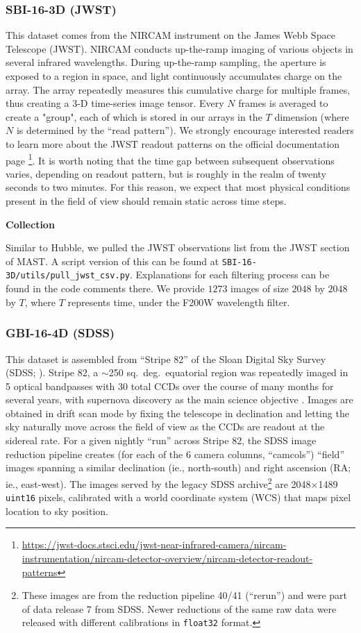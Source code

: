 \subsubsection{SBI-16-3D (JWST)}
This dataset comes from the NIRCAM instrument on the James Webb Space Telescope (JWST).  NIRCAM conducts up-the-ramp imaging of various objects in several infrared wavelengths. During up-the-ramp sampling, the aperture is exposed to a region in space, and light continuously accumulates charge on the array. The array repeatedly measures this cumulative charge for multiple frames, thus creating a 3-D time-series image tensor. Every $N$ frames is averaged to create a "group", each of which is stored in our arrays in the $T$ dimension (where $N$ is determined by the ``read pattern''). We strongly encourage interested readers to learn more about the JWST readout patterns on the official documentation page \footnote{\url{https://jwst-docs.stsci.edu/jwst-near-infrared-camera/nircam-instrumentation/nircam-detector-overview/nircam-detector-readout-patterns}}. It is worth noting that the time gap between subsequent observations varies, depending on readout pattern, but is roughly in the realm of twenty seconds to two minutes. For this reason, we expect that most physical conditions present in the field of view should remain static across time steps.


\textbf{Collection}

Similar to Hubble, we pulled the JWST observations list from the JWST section of MAST. A script version of this can be found at \texttt{SBI-16-3D/utils/pull\_jwst\_csv.py}. Explanations for each filtering process can be found in the code comments there. We provide $1273$ images of size $2048$ by $2048$ by $T$, where $T$ represents time, under the F200W wavelength filter.

\subsubsection{GBI-16-4D (SDSS)} 
This dataset is assembled from ``Stripe 82'' of the Sloan Digital Sky Survey (SDSS; \citet{2000AJ....120.1579Y}). Stripe 82, a $\sim$250 sq.\ deg.\ equatorial region was repeatedly imaged in 5 optical bandpasses with 30 total CCDs over the course of many months for several years, with supernova discovery as the main science objective \citep{2018PASP..130f4002S}.  Images are obtained in drift scan mode by fixing the telescope in declination and letting the sky naturally move across the field of view as the CCDs are readout at the sidereal rate. For a given nightly ``run'' across Stripe 82, the SDSS image reduction pipeline \citep{2002AJ....123..485S} creates (for each of the 6 camera columns, ``camcols'') ``field'' images spanning a similar declination (ie., north-south) and right ascension (RA; ie., east-west). The images served by the legacy SDSS archive\footnote{These images are from the reduction pipeline 40/41 (``rerun'') and were part of data release 7 from SDSS. Newer reductions of the same raw data were released with different calibrations in {\tt float32} format.} are 2048$\times$1489 {\tt uint16} pixels, calibrated with a world coordinate system (WCS) that maps pixel location to sky position.

